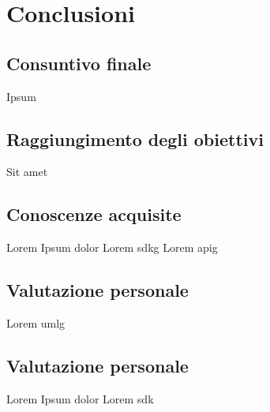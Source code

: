 \chapter{Conclusioni}
\label{chap:conclusioni}

\section{Consuntivo finale}
Ipsum

\section{Raggiungimento degli obiettivi}
Sit amet

\section{Conoscenze acquisite}
Lorem Ipsum dolor Lorem \gls{sdkg}
Lorem \gls{apig}

\section{Valutazione personale}
Lorem \gls{umlg}

\section{Valutazione personale}
Lorem Ipsum dolor Lorem \gls{sdk}

\newpage